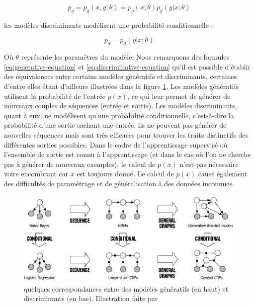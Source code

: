 \documentclass[12pt,a4paper,times,twoside,openright]{report}
\begin{document}
\begin{equation}\label{eq:generative-equation}
p_{g} = p_{g}(x,y;\theta) = p_{g}(x;\theta)p_{g}(y|x;\theta)
\end{equation}

les modèles discriminants modélisent une probabilité conditionnelle :

\begin{equation}\label{eq:discriminative-equation}
p_{d} = p_{d}(y|x;\theta)
\end{equation}

Où $\theta$ représente les paramètres du modèle. Nous remarquons des formules \ref{eq:generative-equation} et \ref{eq:discriminative-equation} qu'il est possible d'établir des équivalences entre certains modèles génératifs et discriminants, certaines d'entre elles étant d'ailleurs illustrées dans la figure \ref{fig:generative-vs-discriminative}. Les modèles génératifs utilisent la probabilité de l'entrée $p(x)$, ce qui leur permet de générer de nouveaux couples de séquences (entrée et sortie). Les modèles discriminants, quant à eux, ne modélisent qu'une probabilité conditionnelle, c'est-à-dire la probabilité d'une sortie sachant une entrée, ils ne peuvent pas générer de nouvelles séquences mais sont très efficaces pour trouver les traits distinctifs des différentes sorties possibles. Dans le cadre de l'apprentissage supervisé où l'ensemble de sortie est connu à l'apprentissage (et dans le cas où l'on ne cherche pas à générer de nouveaux exemples), le calcul de $p(x)$ n'est pas nécessaire voire encombrant car $x$ est toujours donné. Le calcul de $p(x)$ cause également des difficultés de paramétrage et de généralisation à des données inconnues.

\begin{figure}[ht!]
\centering
\includegraphics[scale=1.2]{images/general/generative-vs-discriminative}
\caption{quelques correspondances entre des modèles génératifs (en haut) et discriminants (en bas). Illustration faite par \citet{sutton2010introduction}}
\label{fig:generative-vs-discriminative}
\end{figure}
\end{document}
